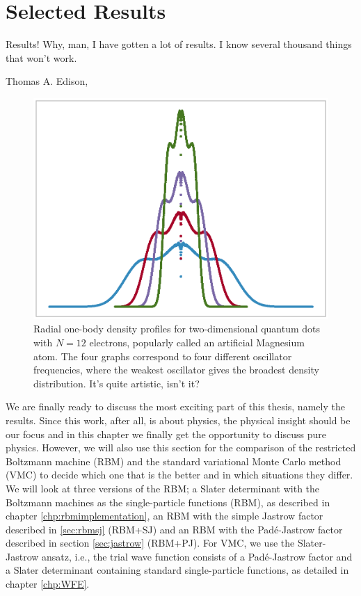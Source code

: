 \chapter{Selected Results} \label{chp:results}
\epigraph{Results! Why, man, I have gotten a lot of results. I know several thousand things that won't work.}{Thomas A. Edison, \cite{noauthor_edisonian_nodate}}
\begin{figure}[H]
	\centering
	\includegraphics[scale=0.6]{../Images/art.eps}
	\caption{Radial one-body density profiles for two-dimensional quantum dots with $N=12$ electrons, popularly called an artificial Magnesium atom. The four graphs correspond to four different oscillator frequencies, where the weakest oscillator gives the broadest density distribution. It's quite artistic, isn't it?}
\end{figure}

We are finally ready to discuss the most exciting part of this thesis, namely the results. Since this work, after all, is about physics, the physical insight should be our focus and in this chapter we finally get the opportunity to discuss pure physics. However, we will also use this section for the comparison of the restricted Boltzmann machine (RBM) and the standard variational Monte Carlo method (VMC) to decide which one that is the better and in which situations they differ. We will look at three versions of the RBM; a Slater determinant with the Boltzmann machines as the single-particle functions (RBM), as described in chapter \ref{chp:rbmimplementation}, an RBM with the simple Jastrow factor described in  \ref{sec:rbmsj} (RBM+SJ) and an RBM with the Padé-Jastrow factor described in section \ref{sec:jastrow} (RBM+PJ). For VMC, we use the Slater-Jastrow ansatz, i.e., the trial wave function consists of a Padé-Jastrow factor and a Slater determinant containing standard single-particle functions, as detailed in chapter \ref{chp:WFE}. 


